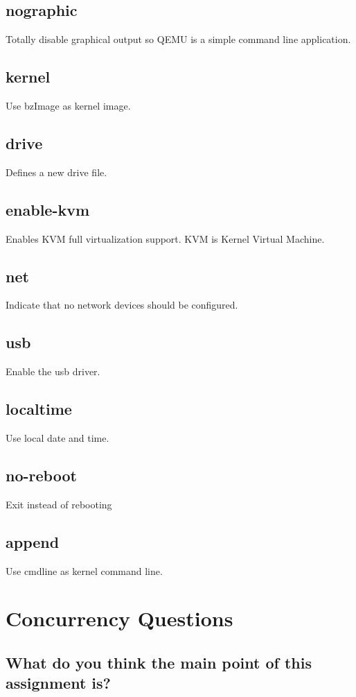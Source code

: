 \documentclass[10pt,letterpaper,onecolumn,draftclsnofoot]{IEEEtran}
\begin{document}
\subsection{nographic}
Totally disable graphical output so QEMU is a simple command line application.

\subsection{kernel}
Use bzImage as kernel image.

\subsection{drive}
Defines a new drive file.

\subsection{enable-kvm}
Enables KVM full virtualization support. KVM is Kernel Virtual Machine.

\subsection{net}
Indicate that no network devices should be configured.

\subsection{usb}
Enable the usb driver.

\subsection{localtime}
Use local date and time.

\subsection{no-reboot}
Exit instead of rebooting

\subsection{append}
Use cmdline as kernel command line.

\section{Concurrency Questions}
\subsection{What do you think the main point of this assignment is?}
\end{document}
